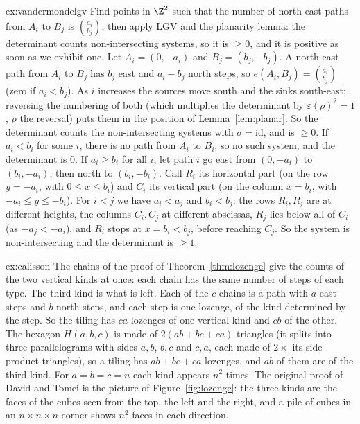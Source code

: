 \begin{solution}{ex:vandermondelgv}
\idea Find points in $\Z^2$ such that the number of north-east paths from $A_i$ to $B_j$ is $\binom{a_i}{b_j}$, then apply
LGV and the planarity lemma: the determinant counts non-intersecting systems, so it is $\ge0$, and it is positive as soon as
we exhibit one.
\writeup Let $A_i=(0,-a_i)$ and $B_j=(b_j,-b_j)$. A north-east path from $A_i$ to $B_j$ has $b_j$ east and $a_i-b_j$ north steps,
so $e(A_i,B_j)=\binom{a_i}{b_j}$ (zero if $a_i<b_j$). As $i$ increases the sources move south and the sinks south-east;
reversing the numbering of both (which multiplies the determinant by $\varepsilon(\rho)^2=1$, $\rho$ the reversal) puts them in the
position of Lemma~\ref{lem:planar}. So the determinant counts the non-intersecting systems with $\sigma=\mathrm{id}$, and is
$\ge0$. If $a_i<b_i$ for some $i$, there is no path from $A_i$ to $B_i$, so no such system, and the determinant is $0$. If
$a_i\ge b_i$ for all $i$, let path $i$ go east from $(0,-a_i)$ to $(b_i,-a_i)$, then north to $(b_i,-b_i)$. Call $R_i$ its horizontal part (on the row $y=-a_i$, with $0\le x\le b_i$) and $C_i$ its vertical part (on the column
$x=b_i$, with $-a_i\le y\le-b_i$). For $i<j$ we have $a_i<a_j$ and $b_i<b_j$: the rows $R_i,R_j$ are at different heights, the
columns $C_i,C_j$ at different abscissas, $R_j$ lies below all of $C_i$ (as $-a_j<-a_i$), and $R_i$ stops at $x=b_i<b_j$, before
reaching $C_j$. So the system is non-intersecting and the determinant is $\ge1$.
\end{solution}

\begin{solution}{ex:calisson}
\idea The chains of the proof of Theorem~\ref{thm:lozenge} give the counts of the two vertical kinds at once: each chain
has the same number of steps of each type. The third kind is what is left.
\writeup Each of the $c$ chains is a path with $a$ east steps and $b$ north steps, and each step is one lozenge, of the
kind determined by the step. So the tiling has $ca$ lozenges of one vertical kind and $cb$ of the other. The hexagon
$H(a,b,c)$ is made of $2(ab+bc+ca)$ triangles (it splits into three parallelograms with sides $a,b$, $b,c$ and $c,a$, each made
of $2\times$ its side product triangles), so a tiling has $ab+bc+ca$ lozenges, and $ab$ of them are of the third kind.
For $a=b=c=n$ each kind appears $n^2$ times. The original proof of David and Tomei is the picture of
Figure~\ref{fig:lozenge}: the three kinds are the faces of the cubes seen from the top, the left and the right, and a pile of
cubes in an $n\times n\times n$ corner shows $n^2$ faces in each direction.
\end{solution}

